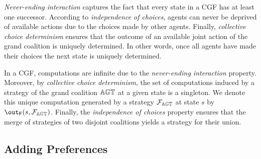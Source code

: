 \documentclass{article}
\begin{document}
\emph{Never-ending interaction} captures the fact that every state in a CGF has at least one successor. 
According to \emph{independence of choices}, agents can never be deprived of available actions  due to the choices made by other agents. 
Finally, \emph{collective choice  determinism} ensures
that the outcome of an available joint action of the grand coalition is uniquely determined. In other words,
once all agents have made their choices the next state is uniquely determined. 



In a CGF, computations are infinite due to the \emph{never-ending interaction} property. 
Moreover, by \emph{collective choice determinism}, the set of computations induced by a strategy of the grand coalition $\mathbb{AGT}$ at a given state is a singleton. 
We denote this unique computation generated by a strategy $\mathcal{F}_{\mathbb{AGT}}$ at state $s$ by $\out_\F(s, \js_\AGT)$. 
Finally, the \emph{independence of choices} property ensures that the merge of strategies of two disjoint coalitions yields a strategy for their union.
 



\subsection{Adding   Preferences }
\end{document}
